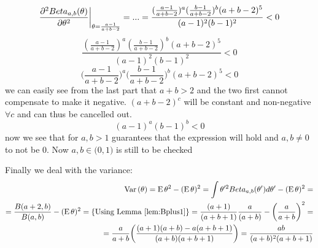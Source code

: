 \documentclass[a4paper,twoside=false,abstract=false,numbers=noenddot,
titlepage=false,headings=small,parskip=half,version=last]{scrartcl}
\begin{document}
\begin{solution}
    \begin{equation}
        {
            \frac{\partial^2{
                Beta_{a,b}(\theta)
            }}{\partial{
                \theta
            }^2}
        }\bigg|_{
            \theta=\frac{a-1}{a+b-2}
        } = ... = 
        \frac{
            (
                \frac{
                    a-1 
                }{
                    a+b-2
                }   
            )^a
            (
                \frac{
                    b-1 
                }{
                    a+b-2
                }   
            )^b
            (a+b-2)^5
        }{
            (a-1)^2(b-1)^2
        } < 0
    \end{equation}
    \begin{equation}
        \frac{
            (
                \frac{
                    a-1 
                }{
                    a+b-2
                }   
            )^a
            (
                \frac{
                    b-1 
                }{
                    a+b-2
                }   
            )^b
            (a+b-2)^5
        }{
            (a-1)^2(b-1)^2
        } < 0
    \end{equation}
    \begin{equation}
        {
            \bigg(
                \frac{
                    a-1 
                }{
                    a+b-2
                }   
            \bigg)^a
            \bigg(
                \frac{
                    b-1 
                }{
                    a+b-2
                }   
            \bigg)^b
            (a+b-2)^5
        } < 0
    \end{equation}
    we can easily see from the last part that $a+b>2$ and the two first cannot
    compensate to make it negative.
    $(a+b-2)^c$ will be constant and non-negative $\forall c$ and can thus be cancelled out.
    \begin{equation}
        {
            (
                    a-1 
            )^a
            (
                    b-1 
            )^b
        } < 0
    \end{equation}
    now we see that for $a,b>1$ guarantees that the expression will hold and 
    $a,b\neq0$ to not be $0$. Now
    $a,b\in \big(0,1\big)$ is still to be checked
    

    Finally we deal with the variance: 
    \begin{equation}
        \begin{split}
            {\rm Var}\,(\theta)={\rm E}\,\theta^2 - ({\rm E}\,\theta)^2=
            \int\theta'^2 Beta_{a,b}(\theta')d\theta' - ({\rm E}\,\theta)^2= \\
            = \frac{B(a+2,b)}{B(a,b)} - ({\rm E}\,\theta)^2 = \{\text{Using
            Lemma \ref{lem:Bplus1}}\}=
            \frac{(a+1)}{(a+b+1)}\frac{a}{(a+b)} - \bigg(\frac{a}{a+b}\bigg)^2 =
            \\
            = \frac{a}{a+b}\bigg(\frac{(a+1)(a+b)-a(a+b+1)}{(a+b)(a+b+1)}\bigg)
            = \frac{ab}{(a+b)^2(a+b+1)}
        \end{split}    
    \end{equation}

\end{solution}
\end{document}

